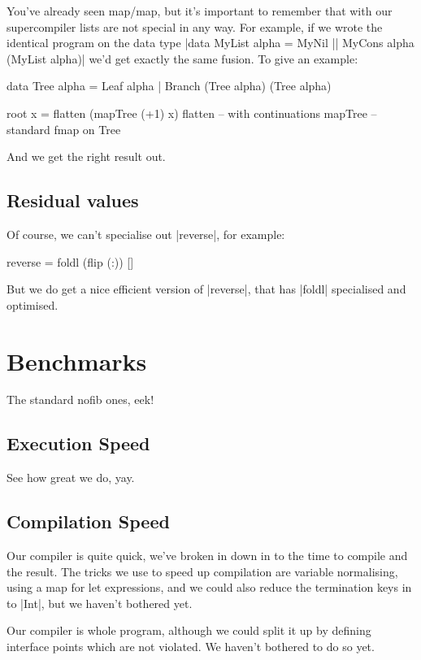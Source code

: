 \documentclass{sigplanconf}
\begin{document}
You've already seen map/map, but it's important to remember that with our supercompiler lists are not special in any way. For example, if we wrote the identical program on the data type |data MyList alpha = MyNil || MyCons alpha (MyList alpha)| we'd get exactly the same fusion. To give an example:

\begin{code}
data Tree alpha = Leaf alpha | Branch (Tree alpha) (Tree alpha)

root x = flatten (mapTree (+1) x)
flatten -- with continuations
mapTree -- standard fmap on Tree
\end{code}

And we get the right result out.

\subsection{Residual values}

Of course, we can't specialise out |reverse|, for example:

\begin{code}
reverse = foldl (flip (:)) []
\end{code}

But we do get a nice efficient version of |reverse|, that has |foldl| specialised and optimised.

\section{Benchmarks}
\label{sec:benchmarks}

The standard nofib ones, eek!

\subsection{Execution Speed}

See how great we do, yay.

\subsection{Compilation Speed}

Our compiler is quite quick, we've broken in down in to the time to compile and the result. The tricks we use to speed up compilation are variable normalising, using a map for let expressions, and we could also reduce the termination keys in to |Int|, but we haven't bothered yet.

Our compiler is whole program, although we could split it up by defining interface points which are not violated. We haven't bothered to do so yet.
\end{document}
